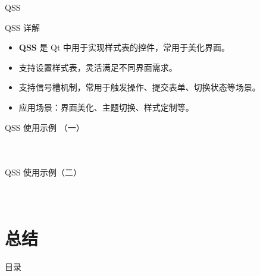 \documentclass[UTF8,aspectratio=169]{beamer}
\begin{document}
\begin{frame}{QSS}
    \begin{ytublock}{QSS 详解}
        \begin{itemize}
            \item \textbf{QSS} 是 Qt 中用于实现样式表的控件，常用于美化界面。
            \item 支持设置样式表，灵活满足不同界面需求。
            \item 支持信号槽机制，常用于触发操作、提交表单、切换状态等场景。
            \item 应用场景：界面美化、主题切换、样式定制等。
        \end{itemize}
    \end{ytublock}
\end{frame}

\begin{frame}[fragile]{QSS 使用示例 （一）}
    \begin{columns}
        \begin{column}{0.48\textwidth}
            \inputminted[firstline=1,lastline=19]{cpp}{code/qt_qss_example.cpp}
        \end{column}
        \begin{column}{0.48\textwidth}
            \inputminted[firstline=20,lastline=39]{cpp}{code/qt_qss_example.cpp}
        \end{column}
    \end{columns}
\end{frame}

\begin{frame}[fragile]{QSS 使用示例（二）}
    \begin{columns}
        \begin{column}{0.48\textwidth}
            \inputminted[firstline=40,lastline=58]{cpp}{code/qt_qss_example.cpp}
        \end{column}
        \begin{column}{0.48\textwidth}
            \inputminted[firstline=59,lastline=78]{cpp}{code/qt_qss_example.cpp}
        \end{column}
    \end{columns}
\end{frame}


\section{总结}
\begin{frame}{目录}
    \begin{multicols}{2}
        \tableofcontents[currentsection]
    \end{multicols}
\end{frame}
\end{document}
